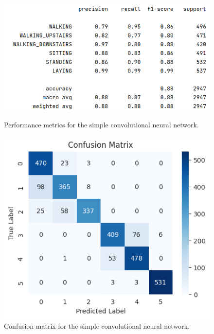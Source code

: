 \begin{figure}[ht]
    \centering
    \begin{minipage}{0.45\textwidth}
        \centering
        \includegraphics[width=\textwidth]{./img/cnn/simple/performance-metrics}
        \caption{Performance metrics for the simple convolutional neural network.}
        \label{fig:cnn-simple-performance-metrics}
    \end{minipage}\hfill
    \begin{minipage}{0.45\textwidth}
        \centering
        \includegraphics[width=\textwidth]{./img/cnn/simple/confusion-matrix}
        \caption{Confusion matrix for the simple convolutional neural network.}
        \label{fig:cnn-simple-confusion-matrix}
    \end{minipage}
\end{figure}

